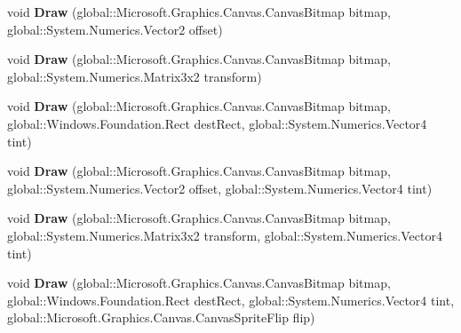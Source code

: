 \begin{DoxyCompactItemize}
void {\bfseries Draw} (global\+::\+Microsoft.\+Graphics.\+Canvas.\+Canvas\+Bitmap bitmap, global\+::\+System.\+Numerics.\+Vector2 offset)
\item 
\mbox{\label{interface_microsoft_1_1_graphics_1_1_canvas_1_1_i_canvas_sprite_batch_ab0083cf0eb076b27d60e179234004436}} 
void {\bfseries Draw} (global\+::\+Microsoft.\+Graphics.\+Canvas.\+Canvas\+Bitmap bitmap, global\+::\+System.\+Numerics.\+Matrix3x2 transform)
\item 
\mbox{\label{interface_microsoft_1_1_graphics_1_1_canvas_1_1_i_canvas_sprite_batch_a858a891f85b1b06333536091c54eefac}} 
void {\bfseries Draw} (global\+::\+Microsoft.\+Graphics.\+Canvas.\+Canvas\+Bitmap bitmap, global\+::\+Windows.\+Foundation.\+Rect dest\+Rect, global\+::\+System.\+Numerics.\+Vector4 tint)
\item 
\mbox{\label{interface_microsoft_1_1_graphics_1_1_canvas_1_1_i_canvas_sprite_batch_a74de3e1e7c2648ca4c114b88d8751e12}} 
void {\bfseries Draw} (global\+::\+Microsoft.\+Graphics.\+Canvas.\+Canvas\+Bitmap bitmap, global\+::\+System.\+Numerics.\+Vector2 offset, global\+::\+System.\+Numerics.\+Vector4 tint)
\item 
\mbox{\label{interface_microsoft_1_1_graphics_1_1_canvas_1_1_i_canvas_sprite_batch_a43b4642b34dc5a505f5641f8ff427b90}} 
void {\bfseries Draw} (global\+::\+Microsoft.\+Graphics.\+Canvas.\+Canvas\+Bitmap bitmap, global\+::\+System.\+Numerics.\+Matrix3x2 transform, global\+::\+System.\+Numerics.\+Vector4 tint)
\item 
\mbox{\label{interface_microsoft_1_1_graphics_1_1_canvas_1_1_i_canvas_sprite_batch_ab1352e40c4e4dc5470141c64e30a1bbf}} 
void {\bfseries Draw} (global\+::\+Microsoft.\+Graphics.\+Canvas.\+Canvas\+Bitmap bitmap, global\+::\+Windows.\+Foundation.\+Rect dest\+Rect, global\+::\+System.\+Numerics.\+Vector4 tint, global\+::\+Microsoft.\+Graphics.\+Canvas.\+Canvas\+Sprite\+Flip flip)
\item 
\mbox{\label{interface_microsoft_1_1_graphics_1_1_canvas_1_1_i_canvas_sprite_batch_a3dbc3671a300529cccb128a7e731641a}} 

\end{DoxyCompactItemize}
